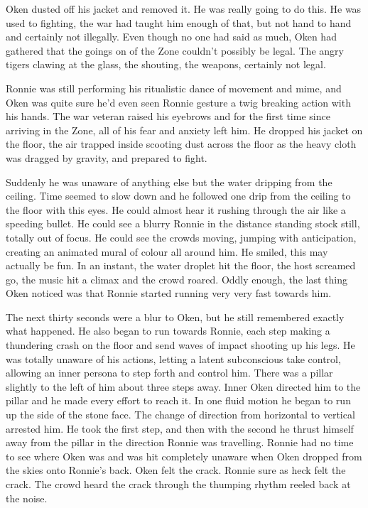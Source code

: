Oken dusted off his jacket and removed it. He was really going to do this. He was used to fighting, the war had taught him enough of that, but not hand to hand and certainly not illegally. Even though no one had said as much, Oken had gathered that the goings on of the Zone couldn't possibly be legal. The angry tigers clawing at the glass, the shouting, the weapons, certainly not legal.

Ronnie was still performing his ritualistic dance of movement and mime, and Oken was quite sure he'd even seen Ronnie gesture a twig breaking action with his hands. The war veteran raised his eyebrows and for the first time since arriving in the Zone, all of his fear and anxiety left him. He dropped his jacket on the floor, the air trapped inside scooting dust across the floor as the heavy cloth was dragged by gravity, and prepared to fight.

Suddenly he was unaware of anything else but the water dripping from the ceiling. Time seemed to slow down and he followed one drip from the ceiling to the floor with this eyes. He could almost hear it rushing through the air like a speeding bullet. He could see a blurry Ronnie in the distance standing stock still, totally out of focus. He could see the crowds moving, jumping with anticipation, creating an animated mural of colour all around him. He smiled, this may actually be fun. In an instant, the water droplet hit the floor, the host screamed go, the music hit a climax and the crowd roared. Oddly enough, the last thing Oken noticed was that Ronnie started running very very fast towards him.

The next thirty seconds were a blur to Oken, but he still remembered exactly what happened. He also began to run towards Ronnie, each step making a thundering crash on the floor and send waves of impact shooting up his legs. He was totally unaware of his actions, letting a latent subconscious take control, allowing an inner persona to step forth and control him. There was a pillar slightly to the left of him about three steps away. Inner Oken directed him to the pillar and he made every effort to reach it. In one fluid motion he began to run up the side of the stone face. The change of direction from horizontal to vertical arrested him. He took the first step, and then with the second he thrust himself away from the pillar in the direction Ronnie was travelling. Ronnie had no time to see where Oken was and was hit completely unaware when Oken dropped from the skies onto Ronnie's back. Oken felt the crack. Ronnie sure as heck felt the crack. The crowd heard the crack through the thumping rhythm reeled back at the noise.

